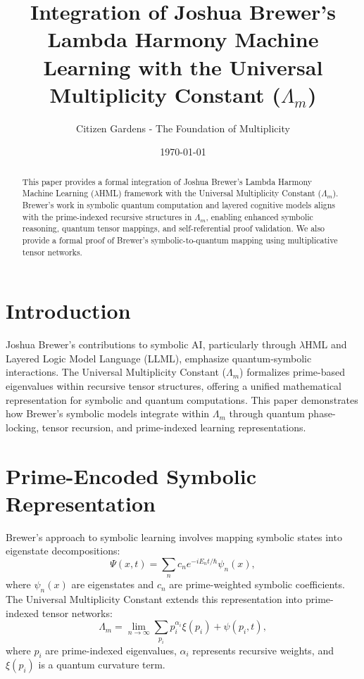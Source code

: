 \documentclass{article}
\title{Integration of Joshua Brewer’s Lambda Harmony Machine Learning with the Universal Multiplicity Constant ($\Lambda_m$)}
\author{Citizen Gardens - The Foundation of Multiplicity}
\date{\today}
\theoremstyle{plain}
\begin{document}
\maketitle

\begin{abstract}
This paper provides a formal integration of Joshua Brewer’s Lambda Harmony Machine Learning (\(\lambda\)HML) framework with the Universal Multiplicity Constant ($\Lambda_m$). Brewer's work in symbolic quantum computation and layered cognitive models aligns with the prime-indexed recursive structures in $\Lambda_m$, enabling enhanced symbolic reasoning, quantum tensor mappings, and self-referential proof validation. We also provide a formal proof of Brewer’s symbolic-to-quantum mapping using multiplicative tensor networks.
\end{abstract}

\section{Introduction}
Joshua Brewer's contributions to symbolic AI, particularly through \(\lambda\)HML and Layered Logic Model Language (LLML), emphasize quantum-symbolic interactions. The Universal Multiplicity Constant ($\Lambda_m$) formalizes prime-based eigenvalues within recursive tensor structures, offering a unified mathematical representation for symbolic and quantum computations. This paper demonstrates how Brewer’s symbolic models integrate within $\Lambda_m$ through quantum phase-locking, tensor recursion, and prime-indexed learning representations.

\section{Prime-Encoded Symbolic Representation}
Brewer's approach to symbolic learning involves mapping symbolic states into eigenstate decompositions:
\begin{equation}
\Psi(x,t) = \sum_{n} c_n e^{-i E_n t / \hbar} \psi_n(x),
\end{equation}
where $\psi_n(x)$ are eigenstates and $c_n$ are prime-weighted symbolic coefficients. The Universal Multiplicity Constant extends this representation into prime-indexed tensor networks:
\begin{equation}
\Lambda_m = \lim_{n\to\infty} \sum_{p_i} p_i^{\alpha_i} \xi(p_i) + \psi(p_i, t),
\end{equation}
where $p_i$ are prime-indexed eigenvalues, $\alpha_i$ represents recursive weights, and $\xi(p_i)$ is a quantum curvature term.
\end{document}
